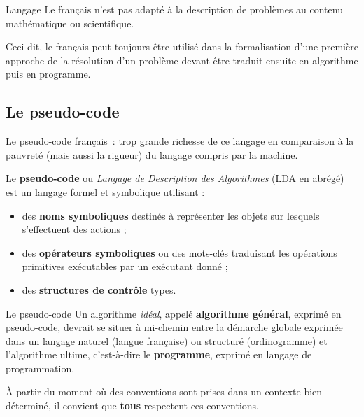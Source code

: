 \begin{frame}{Langage}
	Le français n’est pas adapté à la description de problèmes au contenu
	mathématique ou scientifique.
	
	Ceci dit, le français peut toujours être
	utilisé dans la formalisation d’une première approche de la résolution
	d’un problème devant être traduit ensuite en algorithme puis en
	programme.

\end{frame}

\subsection{Le pseudo-code}

\begin{frame}{Le pseudo-code}
	français~: trop grande richesse de ce langage en
	comparaison à la pauvreté (mais aussi la rigueur) 
	du langage compris par la machine.
	
	\bigskip
	Le \textbf{pseudo-code} ou \textit{Langage de Description des
	Algorithmes} (LDA en abrégé) est un langage formel et symbolique
	utilisant :

	\begin{itemize}
	\item
		des \textbf{noms symboliques} destinés à représenter les objets sur
		lesquels s’effectuent des actions ;
	\item
		des \textbf{opérateurs symboliques} ou des mots-clés traduisant les
		opérations primitives exécutables par un exécutant donné ;
	\item
		des \textbf{structures de contrôle} types.
	\end{itemize}
\end{frame}

\begin{frame}{Le pseudo-code}
	Un algorithme \textit{idéal}, appelé \textbf{algorithme
	général}, exprimé en pseudo-code, devrait se situer à mi-chemin entre
	la démarche globale exprimée dans un langage naturel (langue française)
	ou structuré (ordinogramme) et l’algorithme ultime, c’est-à-dire le
	\textbf{programme}, exprimé en langage de programmation.
	
	\bigskip
	
	À partir du moment où des conventions sont prises dans un
	contexte bien déterminé, il convient que \textbf{tous }respectent ces
	conventions.

\end{frame}

